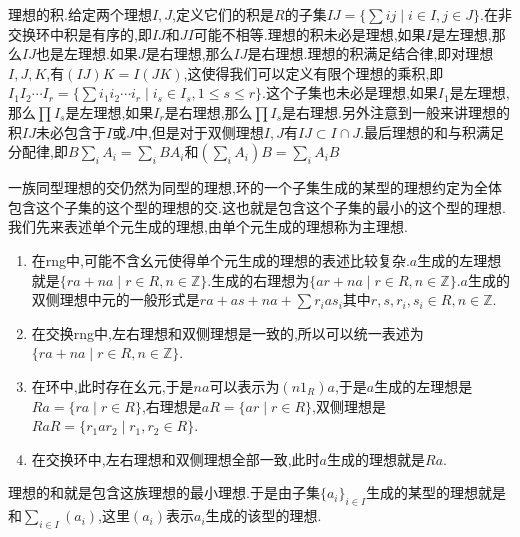 理想的积.给定两个理想$I,J$,定义它们的积是$R$的子集$IJ=\{\sum ij\mid i\in I,j\in J\}$.在非交换环中积是有序的,即$IJ$和$JI$可能不相等.理想的积未必是理想,如果$I$是左理想,那么$IJ$也是左理想.如果$J$是右理想,那么$IJ$是右理想.理想的积满足结合律,即对理想$I,J,K$,有$(IJ)K=I(JK)$,这使得我们可以定义有限个理想的乘积,即$I_1I_2\cdots I_r=\{\sum i_1i_2\cdots i_r\mid i_s\in I_s,1\le s\le r\}$.这个子集也未必是理想,如果$I_1$是左理想,那么$\prod I_s$是左理想,如果$I_r$是右理想,那么$\prod I_s$是右理想.另外注意到一般来讲理想的积$IJ$未必包含于$I$或$J$中,但是对于双侧理想$I,J$有$IJ\subset I\cap J$.最后理想的和与积满足分配律,即$B\sum_i A_i=\sum_i BA_i$和$(\sum_iA_i)B=\sum_iA_iB$

一族同型理想的交仍然为同型的理想,环的一个子集生成的某型的理想约定为全体包含这个子集的这个型的理想的交.这也就是包含这个子集的最小的这个型的理想.我们先来表述单个元生成的理想,由单个元生成的理想称为主理想.
\begin{enumerate}
	\item 在rng中,可能不含幺元使得单个元生成的理想的表述比较复杂.$a$生成的左理想就是$\{ra+na\mid r\in R,n\in\mathbb{Z}\}$.生成的右理想为$\{ar+na\mid r\in R,n\in\mathbb{Z}\}$.$a$生成的双侧理想中元的一般形式是$ra+as+na+\sum r_ias_i$其中$r,s,r_i,s_i\in R,n\in\mathbb{Z}$.
	\item 在交换rng中,左右理想和双侧理想是一致的,所以可以统一表述为$\{ra+na\mid r\in R,n\in\mathbb{Z}\}$.
	\item 在环中,此时存在幺元,于是$na$可以表示为$(n1_R)a$,于是$a$生成的左理想是$Ra=\{ra\mid r\in R\}$,右理想是$aR=\{ar\mid r\in R\}$,双侧理想是$RaR=\{r_1ar_2\mid r_1,r_2\in R\}$.
	\item 在交换环中,左右理想和双侧理想全部一致,此时$a$生成的理想就是$Ra$.
\end{enumerate}

理想的和就是包含这族理想的最小理想.于是由子集$\{a_i\}_{i\in I}$生成的某型的理想就是和$\sum_{i\in I}(a_i)$,这里$(a_i)$表示$a_i$生成的该型的理想.

